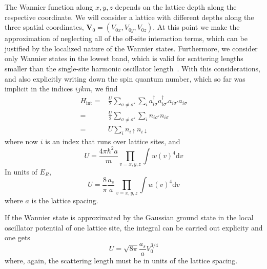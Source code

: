 \documentclass[oneside,11pt]{memoir}
\newcommand{\bv}[1]{\ensuremath{\bm{#1}}}
\newcommand{\bvo}{\ensuremath{\bv{V}_{0}}}
\newcommand{\spup}{\ensuremath{ \uparrow }}
\newcommand{\spdn}{\ensuremath{ \downarrow}}
\begin{document}
The Wannier function along  $x,y,z$ depends on the lattice depth along the
respective coordinate.  We will consider a lattice with different depths along
the three spatial coordinates, $\bvo = ( V_{0x}, V_{0y}, V_{0z} ) $.  At this
point we make the approximation of neglecting all of the off-site interaction
terms, which can be justified by the localized nature of the Wannier states.
Furthermore, we consider only Wannier states in the lowest band, which is valid
for scattering lengths smaller than the single-site harmonic oscillator
length~\cite{Busch1998}.  With this considerations, and also explicitly writing down 
the spin quantum number, which so far was implicit in the indices $ijkm$, we find 
\begin{equation}
\begin{split}
   H_{\text{int}} = &  
           \frac{U}{2}\sum_{\sigma\neq\sigma'}\sum_{i} 
           a_{i\sigma}^{\dagger} a_{i\sigma'}^{\dagger} a_{i\sigma'} a_{i\sigma} \\
     = & 
           \frac{U}{2}\sum_{\sigma\neq\sigma'}\sum_{i}
           n_{i\sigma'} n_{i\sigma}  \\
     = & 
           U\sum_{i}
           n_{i\spup} n_{i\spdn}  
\end{split}
\end{equation}
where now $i$ is an index that runs over lattice sites, and  
\begin{equation}
  U = 
  \frac{ 4 \pi \hbar^{2} a } { m }
   \prod_{v=x,y,z}  \int  w(v) ^{4} \mathrm{d}v  
\end{equation}
In units of $E_{R}$, 
\begin{equation}
  U = \frac{ 8}{ \pi}  \frac{ a_{s} }{a}
   \prod_{v=x,y,z}  \int  w(v) ^{4} \mathrm{d}v  
\end{equation} 
where $a$ is the lattice spacing.  

If the Wannier state is approximated by the Gaussian ground state in the local
oscillator potential of one lattice site, the integral can be carried out
explicity and one gets
~\cite{Bloch2008} 
\begin{equation} 
  U  = \sqrt{ 8\pi } \frac{a_{s}}{a} V_{0}^{3/4} 
\end{equation} 
where, again, the scattering length must be in units of the lattice spacing.
\end{document}
